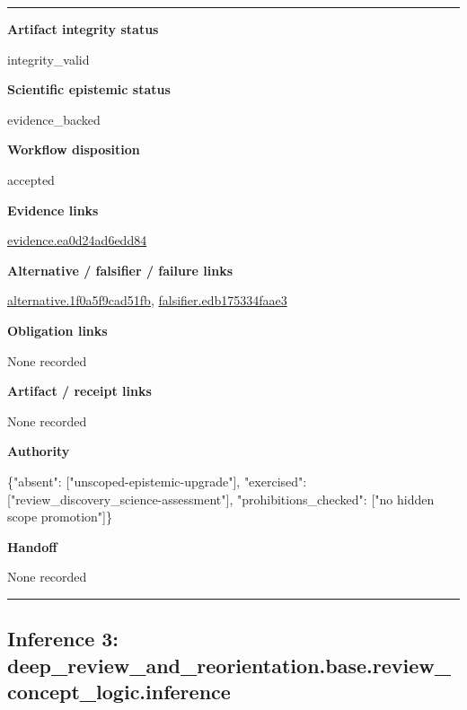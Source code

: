 \documentclass[10pt,a4paper]{article}
\newcommand{\TraceField}[2]{\par\noindent\textbf{#1}\par\noindent #2\par\smallskip}
\newenvironment{TraceDossier}{\par\medskip\noindent\hrule\medskip}{\medskip\hrule\par\medskip}
\begin{document}
\begin{TraceDossier}
\TraceField{Artifact integrity status}{integrity\_\allowbreak{}valid}

\TraceField{Scientific epistemic status}{evidence\_\allowbreak{}backed}

\TraceField{Workflow disposition}{accepted}

\TraceField{Evidence links}{\hyperlink{trace-evidence-4a84b905a934a4a5af}{evidence.\allowbreak{}ea0d24ad6e\allowbreak{}dd84}}

\TraceField{Alternative / falsifier / failure links}{\hyperlink{trace-alternative-d4e1429661c1ff4682}{alternativ\allowbreak{}e.\allowbreak{}1f0a5f9cad\allowbreak{}51fb}, \hyperlink{trace-alternative-8ba3152496a1864fdf}{falsifier.\allowbreak{}edb175334f\allowbreak{}aae3}}

\TraceField{Obligation links}{None recorded}

\TraceField{Artifact / receipt links}{None recorded}

\TraceField{Authority}{\{"absent":\allowbreak{} ["unscoped\allowbreak{}-\allowbreak{}epistemic-\allowbreak{}upgrade"],\allowbreak{} "exercised\allowbreak{}":\allowbreak{} ["review\_\allowbreak{}discovery\_\allowbreak{}science-\allowbreak{}assessment\allowbreak{}"], "prohibiti\allowbreak{}ons\_\allowbreak{}checked":\allowbreak{} ["no hidden scope promotion"\allowbreak{}]\}}

\TraceField{Handoff}{None recorded}

\end{TraceDossier}
\pagebreak[2]\subsection{Inference 3: deep\_\allowbreak{}review\_\allowbreak{}and\_\allowbreak{}reorientat\allowbreak{}ion.\allowbreak{}base.\allowbreak{}review\_\allowbreak{}concept\_\allowbreak{}logic.\allowbreak{}inference}\label{trace-inference-3752d14fa9395d5ef1}
\end{document}
